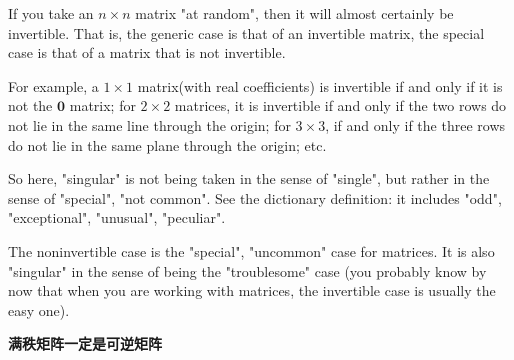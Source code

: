 If you take an $n \times n$ matrix "at random", then it will almost certainly be invertible. 
That is, the generic case is that of an invertible matrix, the special case is that of a matrix that is not invertible.

For example, a $1 \times 1$ matrix(with real coefficients) is invertible if and only if it is not the $\mathbf{0}$ matrix; 
for $2 \times 2$ matrices, it is invertible if and only if the two rows do not lie in the same line through the origin; 
for $3 \times 3$, if and only if the three rows do not lie in the same plane through the origin; etc.

So here, "singular" is not being taken in the sense of "single", but rather in the sense of "special", "not common". 
See the dictionary definition: it includes "odd", "exceptional", "unusual", "peculiar".

The noninvertible case is the "special", "uncommon" case for matrices. 
It is also "singular" in the sense of being the "troublesome" case (you probably know by now that when you are working with matrices, the invertible case is usually the easy one).

\textbf{满秩矩阵一定是可逆矩阵}